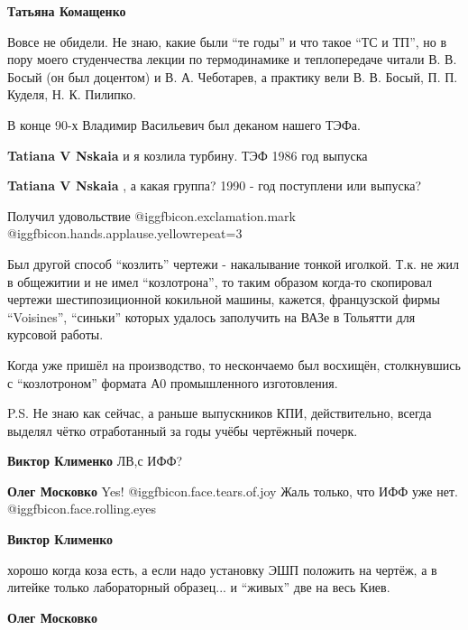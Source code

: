 \begin{itemize}
\begin{itemize}
\begin{itemize}
\textbf{Татьяна Комащенко} 

Вовсе не обидели. Не знаю, какие были \enquote{те годы} и что такое \enquote{ТС и ТП}, но в
пору моего студенчества лекции по термодинамике и теплопередаче читали
В. В. Босый (он был доцентом) и В. А. Чеботарев, а практику вели В. В. Босый,
П. П. Куделя, Н. К. Пилипко.

В конце 90-х Владимир Васильевич был деканом нашего ТЭФа.
\end{itemize} %

\textbf{Tatiana V Nskaia} и я козлила турбину. ТЭФ 1986 год выпуска

\textbf{Tatiana V Nskaia} , а какая группа? 1990 - год поступлени или выпуска?

\end{itemize} %

Получил удовольствие @igg{fbicon.exclamation.mark} @igg{fbicon.hands.applause.yellow}{repeat=3} 


Был другой способ \enquote{козлить} чертежи - накалывание тонкой иголкой. Т.к. не жил в
общежитии и не имел \enquote{козлотрона}, то таким образом когда-то скопировал чертежи
шестипозиционной кокильной машины, кажется, французской фирмы \enquote{Voisines},
\enquote{синьки} которых удалось заполучить на ВАЗе в Тольятти для курсовой работы.

Когда уже пришёл на производство, то нескончаемо был восхищён, столкнувшись с
\enquote{козлотроном} формата А0 промышленного изготовления.

P.S. Не знаю как сейчас, а раньше выпускников КПИ, действительно, всегда
выделял чётко отработанный за годы учёбы чертёжный почерк.

\begin{itemize} %
\textbf{Виктор Клименко} ЛВ,с ИФФ?

\textbf{Олег Московко}
Yes!  @igg{fbicon.face.tears.of.joy} 
Жаль только, что ИФФ уже нет.  @igg{fbicon.face.rolling.eyes} 

\textbf{Виктор Клименко} 

хорошо когда коза есть, а если надо установку ЭШП положить на чертёж, а в
литейке только лабораторный образец... и \enquote{живых} две на весь Киев.

\textbf{Олег Московко}


\end{itemize}
\end{itemize}
